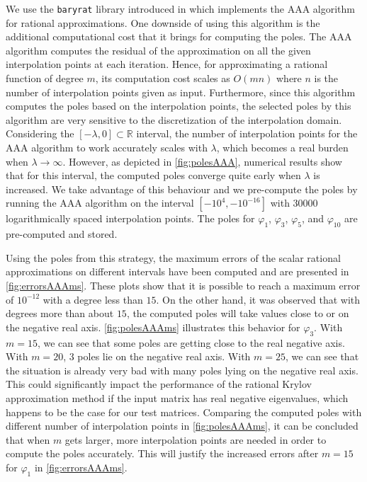 We use the \texttt{baryrat} library introduced in \cite{hofreither2021BRASIL} which implements
the AAA algorithm for rational approximations. One downside of using this algorithm
is the additional computational cost that it brings for computing the poles.
The AAA algorithm  computes the residual of the approximation on all the given interpolation points at
each iteration. Hence, for approximating a rational function of degree $m$, its computation cost scales
as $O(mn)$ where $n$ is the number of interpolation points given as input.
Furthermore, since this algorithm computes the poles based on the interpolation points, the
selected poles by this algorithm are very sensitive to the discretization of the interpolation domain.
Considering the $[-\lambda, 0] \subset \mathbb{R}$ interval, the number of interpolation
points for the AAA algorithm to work accurately scales with $\lambda$, which becomes a real burden
when $\lambda \to \infty$. However, as depicted in \autoref{fig:polesAAA}, numerical results show that
for this interval, the computed poles converge quite early when $\lambda$ is increased. We take
advantage of this behaviour and we pre-compute the poles by running the AAA algorithm
on the interval $[-10^{4}, -10^{-16}]$ with $30000$ logarithmically spaced interpolation points.
The poles for $\varphi_1$, $\varphi_3$, $\varphi_5$, and $\varphi_{10}$ are pre-computed and stored.

Using the poles from this strategy, the maximum errors of the scalar rational approximations on different
intervals have been computed and are presented in \autoref{fig:errorsAAAms}. These plots show that
it is possible to reach a maximum error of $10^{-12}$ with a degree less than $15$.
On the other hand, it was observed that with degrees more than about $15$, the computed poles will take values
close to or on the negative real axis.
\autoref{fig:polesAAAms} illustrates this behavior for $\varphi_3$.
With $m=15$, we can see that some poles are getting close to the real negative axis. With $m=20$, 3 poles
lie on the negative real axis. With $m=25$, we can see that the situation is already very bad with many
poles lying on the negative real axis.
This could significantly impact the performance of the rational Krylov approximation method if the input
matrix has real negative eigenvalues, which happens to be the case for our test matrices.
Comparing the computed poles with different number of interpolation points in \autoref{fig:polesAAAms},
it can be concluded that when $m$ gets larger, more interpolation points are needed in order to compute
the poles accurately. This will justify the increased errors after $m=15$ for $\varphi_1$ in
\autoref{fig:errorsAAAms}.


